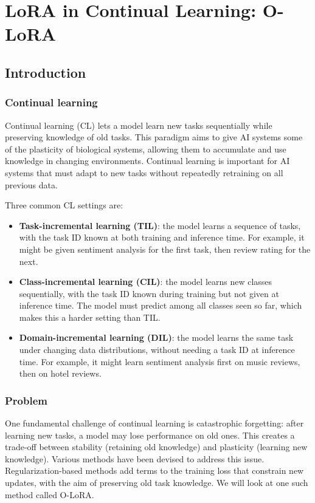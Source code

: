 \section{LoRA in Continual Learning: O-LoRA}
\subsection{Introduction}
\subsubsection{Continual learning}
Continual learning (CL) lets a model learn new tasks sequentially while preserving knowledge of old tasks. This paradigm aims to give AI systems some of the plasticity of biological systems, allowing them to accumulate and use knowledge in changing environments. Continual learning is important for AI systems that must adapt to new tasks without repeatedly retraining on all previous data.

Three common CL settings are:
\begin{itemize}
	\item \textbf{Task-incremental learning (TIL)}: the model learns a sequence of tasks, with the task ID known at both training and inference time. For example, it might be given sentiment analysis for the first task, then review rating for the next.
	\item \textbf{Class-incremental learning (CIL)}: the model learns new classes sequentially, with the task ID known during training but not given at inference time. The model must predict among all classes seen so far, which makes this a harder setting than TIL.
	\item \textbf{Domain-incremental learning (DIL)}: the model learns the same task under changing data distributions, without needing a task ID at inference time. For example, it might learn sentiment analysis first on music reviews, then on hotel reviews.
\end{itemize}

\subsubsection{Problem}
One fundamental challenge of continual learning is catastrophic forgetting: after learning new tasks, a model may lose performance on old ones. This creates a trade-off between stability (retaining old knowledge) and plasticity (learning new knowledge). Various methods have been devised to address this issue. Regularization-based methods add terms to the training loss that constrain new updates, with the aim of preserving old task knowledge. We will look at one such method called O-LoRA.

